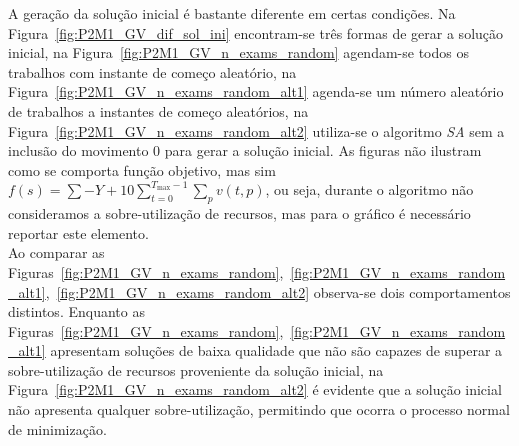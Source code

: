 A geração da solução inicial é bastante diferente em certas condições. Na Figura~\ref{fig:P2M1_GV_dif_sol_ini} encontram-se três formas de gerar a solução inicial, na Figura~\ref{fig:P2M1_GV_n_exams_random} agendam-se todos os trabalhos com instante de começo aleatório, na Figura~\ref{fig:P2M1_GV_n_exams_random_alt1} agenda-se um número aleatório de trabalhos a instantes de começo aleatórios, na Figura~\ref{fig:P2M1_GV_n_exams_random_alt2} utiliza-se o algoritmo \textit{SA} sem a inclusão do movimento 0 para gerar a solução inicial. As figuras não ilustram como se comporta função objetivo, mas sim $f(s) = \sum -Y + 10 \sum_{t=0}^{T_{\max}-1}\sum_{p}v(t,p)$, ou seja, durante o algoritmo não consideramos a sobre-utilização de recursos, mas para o gráfico é necessário reportar este elemento.\\

Ao comparar as Figuras~\ref{fig:P2M1_GV_n_exams_random},~\ref{fig:P2M1_GV_n_exams_random_alt1},~\ref{fig:P2M1_GV_n_exams_random_alt2} observa-se dois comportamentos distintos. Enquanto as Figuras~\ref{fig:P2M1_GV_n_exams_random},~\ref{fig:P2M1_GV_n_exams_random_alt1} apresentam soluções de baixa qualidade que não são capazes de superar a sobre-utilização de recursos proveniente da solução inicial, na Figura~\ref{fig:P2M1_GV_n_exams_random_alt2} é evidente que a solução inicial não apresenta qualquer sobre-utilização, permitindo que ocorra o processo normal de minimização.\\

